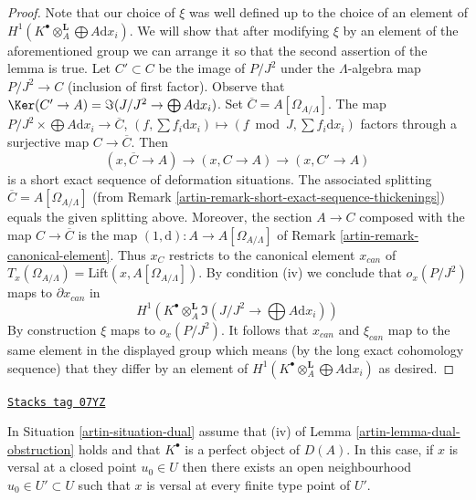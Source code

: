 \begin{proof}
\medskip\noindent
Note that our choice of $\xi$ was well defined up to the choice of an
element of $H^1(K^\bullet \otimes_A^\mathbf{L} \bigoplus A\text{d}x_i)$.
We will show that after modifying $\xi$ by an element of the aforementioned
group we can arrange it so that the second assertion of the lemma is true.
Let $C' \subset C$ be the image of $P/J^2$ under the
$\Lambda$-algebra map $P/J^2 \to C$ (inclusion of first factor).
Observe that
$\Ker(C' \to A) = \Im(J/J^2 \to \bigoplus A\text{d}x_i)$.
Set $\overline{C} = A[\Omega_{A/\Lambda}]$. The map
$P/J^2 \times \bigoplus A \text{d}x_i \to \overline{C}$,
$(f, \sum f_i \text{d}x_i) \mapsto (f \bmod J, \sum f_i \text{d}x_i)$
factors through a surjective map $C \to \overline{C}$. Then
$$
(x, \overline{C} \to A) \to (x, C \to A) \to (x, C' \to A)
$$
is a short exact sequence of deformation situations. The
associated splitting $\overline{C} = A[\Omega_{A/\Lambda}]$ (from
Remark \ref{artin-remark-short-exact-sequence-thickenings}) equals the given
splitting above. Moreover, the section $A \to C$ composed with the map
$C \to \overline{C}$
is the map $(1, \text{d}) : A \to A[\Omega_{A/\Lambda}]$ of
Remark \ref{artin-remark-canonical-element}.
Thus $x_C$ restricts to the canonical element $x_{can}$ of
$T_x(\Omega_{A/\Lambda}) = \text{Lift}(x, A[\Omega_{A/\Lambda}])$.
By condition (iv) we conclude that $o_x(P/J^2)$ maps to $\partial x_{can}$
in
$$
H^1(K^\bullet \otimes_A^\mathbf{L} \Im(J/J^2 \to \bigoplus A\text{d}x_i))
$$
By construction $\xi$ maps to $o_x(P/J^2)$. It follows that
$x_{can}$ and $\xi_{can}$ map to the same element in the
displayed group which means (by the long exact cohomology sequence)
that they differ by an element of
$H^1(K^\bullet \otimes_A^\mathbf{L} \bigoplus A\text{d}x_i)$
as desired.
\end{proof}

\begin{lemma}
\label{artin-lemma-dual-openness}
\href{https://stacks.math.columbia.edu/tag/07YZ}{\texttt{Stacks tag 07YZ}}

In Situation \ref{artin-situation-dual} assume that (iv) of
Lemma \ref{artin-lemma-dual-obstruction} holds and that $K^\bullet$ is a
perfect object of $D(A)$. In this case, if $x$ is versal at a closed
point $u_0 \in U$ then there exists an open neighbourhood
$u_0 \in U' \subset U$ such that $x$ is versal at every finite type
point of $U'$.
\end{lemma}

